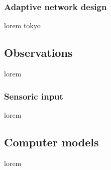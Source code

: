 \subsubsection{Adaptive network design}

lorem tokyo


\subsection{Observations}

lorem


\subsubsection{Sensoric input}

lorem


\subsection{Computer models}

lorem


